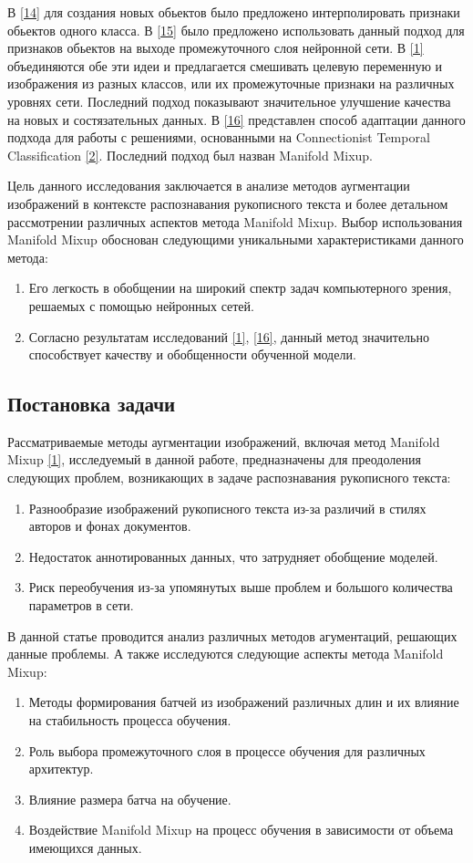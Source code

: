 В \hyperlink{cite.Cha11}{[14]} для создания новых обьектов было предложено интерполировать признаки обьектов одного класса. В \hyperlink{cite.Dev17}{[15]} было предложено использовать данный подход для признаков обьектов на выходе промежуточного слоя нейронной сети. В \hyperlink{cite.Ver18}{[1]} объединяются обе эти идеи и предлагается смешивать целевую переменную и изображения из разных классов, или их промежуточные признаки на различных уровнях сети. Последний подход показывают значительное улучшение качества на новых и состязательных данных. В \hyperlink{cite.Bas19}{[16]} представлен способ адаптации данного подхода для работы с решениями, основанными на Connectionist Temporal Classification \hyperlink{cite.Gra06}{[2]}. Последний подход был назван Manifold Mixup. 

Цель данного исследования заключается в анализе методов аугментации изображений в контексте распознавания рукописного текста и более детальном рассмотрении различных аспектов метода Manifold Mixup. Выбор использования Manifold Mixup обоснован следующими уникальными характеристиками данного метода:
\begin{enumerate}
\item Его легкость в обобщении на широкий спектр задач компьютерного зрения, решаемых с помощью нейронных сетей.
\item Согласно результатам исследований \hyperlink{cite.Ver18}{[1]}, \hyperlink{cite.Bas19}{[16]}, данный метод значительно способствует качеству и обобщенности обученной модели.
\end{enumerate}
 
\subsection{Постановка задачи}
Рассматриваемые методы аугментации изображений, включая метод Manifold Mixup \hyperlink{cite.Ver18}{[1]}, исследуемый в данной работе, предназначены для преодоления следующих проблем, возникающих в задаче распознавания рукописного текста:
\begin{enumerate}
\item Разнообразие изображений рукописного текста из-за различий в стилях авторов и фонах документов.
\item Недостаток аннотированных данных, что затрудняет обобщение моделей.
\item Риск переобучения из-за упомянутых выше проблем и большого количества параметров в сети.
\end{enumerate}
В данной статье проводится анализ различных методов агументаций, решающих данные проблемы. А также исследуются следующие аспекты метода Manifold Mixup:
\begin{enumerate}
\item Методы формирования батчей из изображений различных длин и их влияние на стабильность процесса обучения.
\item Роль выбора промежуточного слоя в процессе обучения для различных архитектур.
\item Влияние размера батча на обучение.
\item Воздействие Manifold Mixup на процесс обучения в зависимости от объема имеющихся данных.
\end{enumerate}

